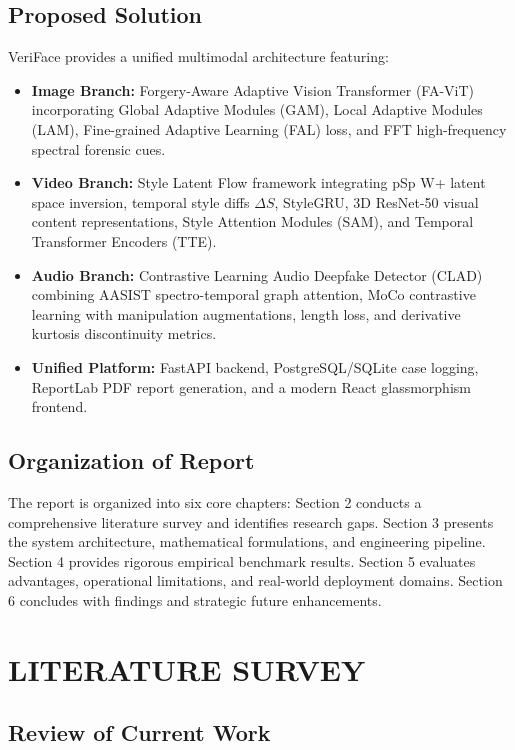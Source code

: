 \documentclass[12pt,a4paper]{report}
\begin{document}
\section{Proposed Solution}
VeriFace provides a unified multimodal architecture featuring:
\begin{itemize}[leftmargin=*]
    \item \textbf{Image Branch:} Forgery-Aware Adaptive Vision Transformer (FA-ViT) incorporating Global Adaptive Modules (GAM), Local Adaptive Modules (LAM), Fine-grained Adaptive Learning (FAL) loss, and FFT high-frequency spectral forensic cues.
    \item \textbf{Video Branch:} Style Latent Flow framework integrating pSp W+ latent space inversion, temporal style diffs $\Delta S$, StyleGRU, 3D ResNet-50 visual content representations, Style Attention Modules (SAM), and Temporal Transformer Encoders (TTE).
    \item \textbf{Audio Branch:} Contrastive Learning Audio Deepfake Detector (CLAD) combining AASIST spectro-temporal graph attention, MoCo contrastive learning with manipulation augmentations, length loss, and derivative kurtosis discontinuity metrics.
    \item \textbf{Unified Platform:} FastAPI backend, PostgreSQL/SQLite case logging, ReportLab PDF report generation, and a modern React glassmorphism frontend.
\end{itemize}

\section{Organization of Report}
The report is organized into six core chapters: Section 2 conducts a comprehensive literature survey and identifies research gaps. Section 3 presents the system architecture, mathematical formulations, and engineering pipeline. Section 4 provides rigorous empirical benchmark results. Section 5 evaluates advantages, operational limitations, and real-world deployment domains. Section 6 concludes with findings and strategic future enhancements.

\chapter{LITERATURE SURVEY}

\section{Review of Current Work}
\end{document}
